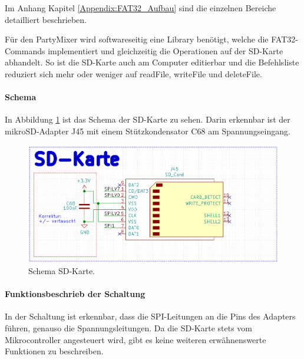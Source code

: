 Im Anhang Kapitel \ref{Appendix:FAT32_Aufbau} sind die einzelnen Bereiche detailliert beschrieben.

Für den PartyMixer wird softwareseitig eine Library benötigt, welche die FAT32-Commands  implementiert und gleichzeitig die Operationen auf der SD-Karte abhandelt. So ist die SD-Karte auch am Computer editierbar und die Befehlsliste reduziert sich mehr oder weniger auf readFile, writeFile und deleteFile.

\paragraph{Schema}\mbox{}

In Abbildung \ref{fig:Schema_SD_Karte} ist das Schema der SD-Karte zu sehen. Darin erkennbar ist der mikroSD-Adapter J45 mit einem Stützkondensator C68 am Spannungseingang.

\begin{figure}[H]
\center
\includegraphics[width = 0.6 \textwidth]{graphics/Schema_SD_Karte}
\caption{Schema SD-Karte.}
\label{fig:Schema_SD_Karte}
\end{figure}

\paragraph{Funktionsbeschrieb der Schaltung}\mbox{}

In der Schaltung ist erkennbar, dass die SPI-Leitungen an die Pins des Adapters führen, genauso die Spannungsleitungen. Da die SD-Karte stets vom Mikrocontroller angesteuert wird, gibt es keine weiteren erwähnenswerte Funktionen zu beschreiben.